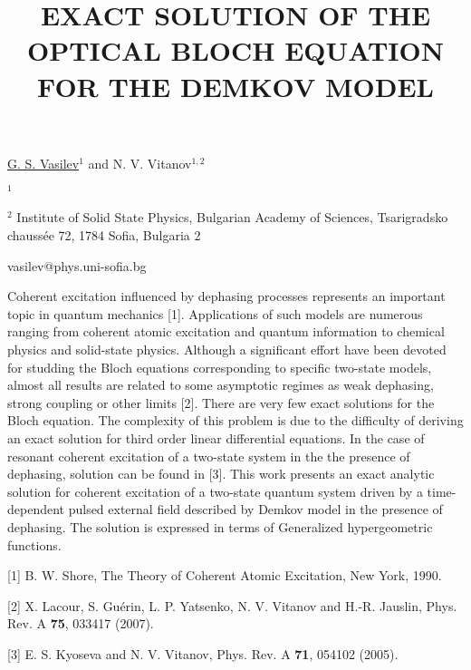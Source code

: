 \title{EXACT SOLUTION OF THE OPTICAL BLOCH EQUATION FOR THE DEMKOV MODEL}

\underline{G. S. Vasilev}$^{1}$ and N. V. Vitanov$^{1,2}$

{\normalsize{

\vspace{-4mm} $^1$\unisofia

\vspace{-4mm} $^2$ Institute of Solid State Physics, Bulgarian
Academy of Sciences, Tsarigradsko chauss\'{e}e 72, 1784 Sofia,
Bulgaria 2


\email vasilev@phys.uni-sofia.bg}}

Coherent excitation influenced by dephasing processes represents
an important topic in quantum mechanics [1]. Applications of such
models are numerous ranging from coherent atomic excitation and
quantum information to chemical physics and solid-state physics.
Although a significant effort have been devoted for studding the
Bloch equations corresponding to specific two-state models, almost
all results are related to some asymptotic regimes as weak
dephasing, strong coupling or other limits [2]. There are very few
exact solutions for the Bloch equation. The complexity of this
problem is due to the difficulty of deriving an exact solution for
third order linear differential equations. In the case of resonant
coherent excitation of a two-state system in the the presence of
dephasing, solution can be found in [3]. This work
presents an exact analytic solution for coherent excitation of a
two-state quantum system driven by a time-dependent pulsed
external field described by Demkov model in the presence of
dephasing. The solution is expressed in terms of Generalized
hypergeometric functions.

{\normalsize
[1] B. W. Shore, The Theory of Coherent Atomic Excitation, New York, 1990.
\vsp

[2] X. Lacour, S. Gu\'erin, L. P. Yatsenko, N. V. Vitanov and H.-R.
Jauslin, Phys. Rev. A \textbf{75}, 033417 (2007).
\vsp

[3] E. S. Kyoseva and N. V. Vitanov, Phys. Rev. A \textbf{71}, 054102 (2005).
}

\vspace{\baselineskip}
